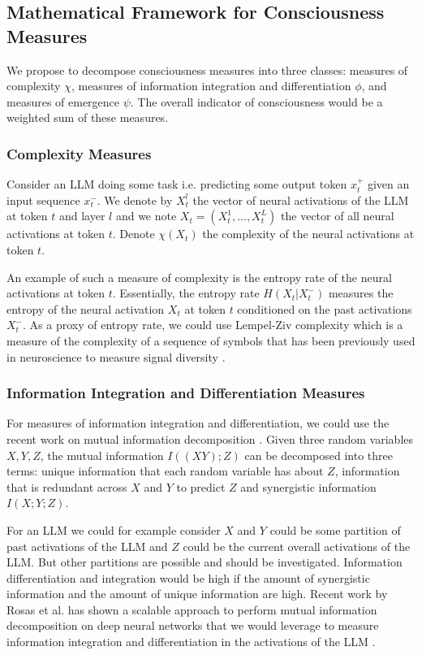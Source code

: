\documentclass[11pt,a4paper]{article}
\begin{document}
\subsection{Mathematical Framework for Consciousness Measures}

We propose to decompose consciousness measures into three classes: measures of complexity $\chi$, measures of information integration and differentiation $\phi$, and measures of emergence $\psi$. The overall indicator of consciousness would be a weighted sum of these measures.

\subsubsection{Complexity Measures}

Consider an LLM doing some task i.e. predicting some output token $x_t^+$ given an input sequence $x_t^-$. We denote by $X_t^l$ the vector of neural activations of the LLM at token $t$ and layer $l$ and we note $X_t = (X_t^1, \ldots, X_t^L)$ the vector of all neural activations at token $t$. Denote $\chi(X_t)$ the complexity of the neural activations at token $t$. 

An example of such a measure of complexity is the entropy rate of the neural activations at token $t$. Essentially, the entropy rate $H(X_t | X_t^-)$ measures the entropy of the neural activation $X_t$ at token $t$ conditioned on the past activations $X_t^-$. As a proxy of entropy rate, we could use Lempel-Ziv complexity which is a measure of the complexity of a sequence of symbols that has been previously used in neuroscience to measure signal diversity \citep{Schartner2015}.

\subsubsection{Information Integration and Differentiation Measures}

For measures of information integration and differentiation, we could use the recent work on mutual information decomposition \citep{Williams2010, Rosas2024}. Given three random variables $X, Y, Z$, the mutual information $I((X Y);Z)$ can be decomposed into three terms: unique information that each random variable has about $Z$, information that is redundant across $X$ and $Y$ to predict $Z$ and synergistic information $I(X; Y; Z)$. 

For an LLM we could for example consider $X$ and $Y$ could be some partition of past activations of the LLM and $Z$ could be the current overall activations of the LLM. But other partitions are possible and should be investigated. Information differentiation and integration would be high if the amount of synergistic information and the amount of unique information are high. Recent work by Rosas et al. has shown a scalable approach to perform mutual information decomposition on deep neural networks that we would leverage to measure information integration and differentiation in the activations of the LLM \citep{Rosas2024}.
\end{document}
